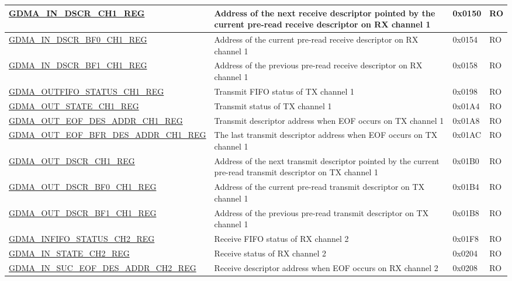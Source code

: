 \begin{longtable}{ | p{6.7cm} | p{6cm} | p{1.3cm} | p{1.5cm} | }
\hyperref[regdesc:GDMAINDSCRCHNREG]{GDMA\_IN\_DSCR\_CH1\_REG} & Address of the next receive descriptor pointed by the current pre-read receive descriptor on RX channel 1 & 0x0150 & RO \\ \hline
\hyperref[regdesc:GDMAINDSCRBF0CHNREG]{GDMA\_IN\_DSCR\_BF0\_CH1\_REG} & Address of the current pre-read receive descriptor on RX channel 1 & 0x0154 & RO \\ \hline
\hyperref[regdesc:GDMAINDSCRBF1CHNREG]{GDMA\_IN\_DSCR\_BF1\_CH1\_REG} & Address of the previous pre-read receive descriptor on RX channel 1 & 0x0158 & RO \\ \hline
\hyperref[regdesc:GDMAOUTFIFOSTATUSCHNREG]{GDMA\_OUTFIFO\_STATUS\_CH1\_REG} & Transmit FIFO status of TX channel 1 & 0x0198 & RO \\ \hline
\hyperref[regdesc:GDMAOUTSTATECHNREG]{GDMA\_OUT\_STATE\_CH1\_REG} & Transmit status of TX channel 1 & 0x01A4 & RO \\ \hline
\hyperref[regdesc:GDMAOUTEOFDESADDRCHNREG]{GDMA\_OUT\_EOF\_DES\_ADDR\_CH1\_REG} & Transmit descriptor address when EOF occurs on TX channel 1 & 0x01A8 & RO \\ \hline
\hyperref[regdesc:GDMAOUTEOFBFRDESADDRCHNREG]{GDMA\_OUT\_EOF\_BFR\_DES\_ADDR\_CH1\newline\_REG} & The last transmit descriptor address when EOF occurs on TX channel 1 & 0x01AC & RO \\ \hline
\hyperref[regdesc:GDMAOUTDSCRCHNREG]{GDMA\_OUT\_DSCR\_CH1\_REG} & Address of the next transmit descriptor pointed by the current pre-read transmit descriptor on TX channel 1 & 0x01B0 & RO \\ \hline
\hyperref[regdesc:GDMAOUTDSCRBF0CHNREG]{GDMA\_OUT\_DSCR\_BF0\_CH1\_REG} & Address of the current pre-read transmit descriptor on TX channel 1 & 0x01B4 & RO \\ \hline
\hyperref[regdesc:GDMAOUTDSCRBF1CHNREG]{GDMA\_OUT\_DSCR\_BF1\_CH1\_REG} & Address of the previous pre-read transmit descriptor on TX channel 1 & 0x01B8 & RO \\ \hline
\hyperref[regdesc:GDMAINFIFOSTATUSCHNREG]{GDMA\_INFIFO\_STATUS\_CH2\_REG} & Receive FIFO status of RX channel 2 & 0x01F8 & RO \\ \hline
\hyperref[regdesc:GDMAINSTATECHNREG]{GDMA\_IN\_STATE\_CH2\_REG} & Receive status of RX channel 2 & 0x0204 & RO \\ \hline
\hyperref[regdesc:GDMAINSUCEOFDESADDRCHNREG]{GDMA\_IN\_SUC\_EOF\_DES\_ADDR\_CH2\_REG} & Receive descriptor address when EOF occurs on RX channel 2 & 0x0208 & RO \\ \hline

\end{longtable}
